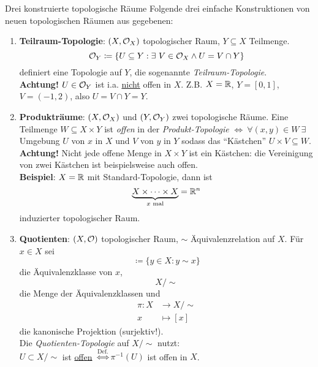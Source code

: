 \begin{bla}{Drei konstruierte topologische Räume}
  Folgende drei einfache Konstruktionen von neuen topologischen Räumen aus gegebenen:
  \begin{enumerate}

    \item \textbf{Teilraum-Topologie}: $ (X, \mathcal{O}_X) $ topologischer Raum, $ Y \subseteq X $ Teilmenge.
    \begin{equation*}
      \mathcal{O}_Y \coloneqq \{ U \subseteq Y : \exists \ V \in \mathcal{O}_X \wedge U = V \cap Y \}
    \end{equation*}
    definiert eine Topologie auf $ Y $, die sogenannte \emph{Teilraum-Topologie}. \\
    \textbf{Achtung!} $ U \in \mathcal{O}_Y $ ist i.a. \underline{nicht} offen in $ X $. Z.B. $ X = \mathbb{R} $, $ Y = [0,1] $, $ V = (-1, 2) $, also $ U = V \cap Y = Y $.

    \item \textbf{Produkträume}: $ (X, \mathcal{O}_X) $ und $ (Y, \mathcal{O}_Y) $ zwei topologische Räume. Eine Teilmenge $ W \subseteq X \times Y $ ist \emph{offen} in der \emph{Produkt-Topologie} $ \Leftrightarrow \ \forall (x, y) \in W \ \exists $ Umgebung $ U $ von $ x $ in $ X $ und $ V $ von $ y $ in $ Y $ sodass das ``Kästchen'' $ U \times V \subseteq W $. \\
    \textbf{Achtung!} Nicht jede offene Menge in $ X \times Y $ ist ein Kästchen: die Vereinigung von zwei Kästchen ist beispielsweise auch offen. \\
    \textbf{Beispiel}: $ X = \mathbb{R} $ mit Standard-Topologie, dann ist
    \begin{equation*}
      \underbrace{X \times \cdots \times X}_{x \text{ mal}} = \mathbb{R}^n
    \end{equation*}
    induzierter topologischer Raum.

    \item \textbf{Quotienten}: $ (X, \mathcal{O}) $ topologischer Raum, $ \sim $ Äquivalenzrelation auf $ X $. Für $ x \in X $ sei
    \begin{equation*}
      [x] \coloneqq  \{ y \in X : y \sim x \}
    \end{equation*}
    die Äquivalenzklasse von $ x $,
    \begin{equation*}
      X/\sim
    \end{equation*}
    die Menge der Äquivalenzklassen und
    \begin{align*}
      \pi : X &\to X/\sim \\
      x &\mapsto [x]
    \end{align*}
    die kanonische Projektion (surjektiv!). \\
    Die \emph{Quotienten-Topologie} auf $ X/\sim $ nutzt: \\
    $ U \subset X/\sim $ ist \underline{offen} $ \overset{\text{Def.}}{\Leftrightarrow} \pi^{-1}(U) $ ist offen in $ X $.
  \end{enumerate}
\end{bla}